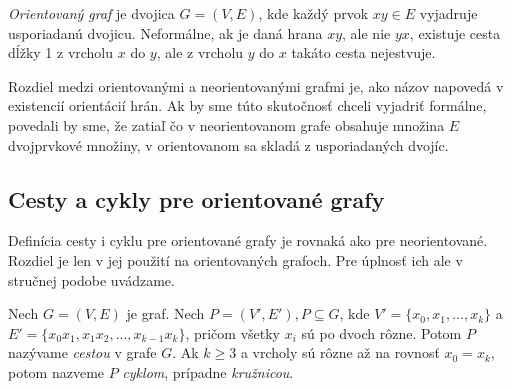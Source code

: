 \textit{Orientovaný graf} je dvojica $G = (V, E)$, kde každý prvok $xy \in E$ vyjadruje usporiadanú dvojicu. Neformálne, ak je daná hrana $xy$, ale nie $yx$, existuje cesta dĺžky 1 z vrcholu $x$ do $y$, ale z vrcholu $y$ do $x$ takáto cesta nejestvuje.\newline

Rozdiel medzi orientovanými a neorientovanými grafmi je, ako názov napovedá v existencií orientácií hrán. Ak by sme túto skutočnosť chceli vyjadriť formálne, povedali by sme, že zatiaľ čo v neorientovanom grafe obsahuje množina $E$ dvojprvkové množiny, v orientovanom sa skladá z usporiadaných dvojíc.\newline


\subsection{Cesty a cykly pre orientované grafy}

Definícia cesty i cyklu pre orientované grafy je rovnaká ako pre neorientované. Rozdiel je len v jej použití na orientovaných grafoch. Pre úplnosť ich ale v stručnej podobe uvádzame.\newline

Nech $G = (V, E)$ je graf. Nech $P = (V', E'), P\subseteq G$, kde $V' = \{x_{0}, x_{1}, ..., x_{k}\}$ a $E' = \{x_{0} x_{1}, x_{1} x_{2}, ..., x_{k-1} x_{k}\}$, pričom všetky $x_{i}$ sú po dvoch rôzne. Potom $P$ nazývame \textit{cestou} v grafe $G$. Ak $k\geq 3$ a vrcholy sú rôzne až na rovnosť $x_{0} = x_{k}$, potom nazveme $P$ \textit{cyklom}, prípadne \textit{kružnicou}. \cite[kapitola 1.4]{bang2008digraphs}



